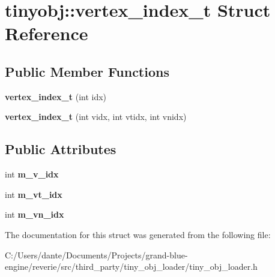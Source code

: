 \hypertarget{structtinyobj_1_1vertex__index__t}{}\section{tinyobj\+::vertex\+\_\+index\+\_\+t Struct Reference}
\label{structtinyobj_1_1vertex__index__t}
\subsection*{Public Member Functions}
\begin{DoxyCompactItemize}
\item 
\mbox{\label{structtinyobj_1_1vertex__index__t_a1319416ee790dddb034ddb6a7b4da78d}} 
{\bfseries vertex\+\_\+index\+\_\+t} (int idx)
\item 
\mbox{\label{structtinyobj_1_1vertex__index__t_a4bc62ff5633deb3d0f6d66c8c9e29bcd}} 
{\bfseries vertex\+\_\+index\+\_\+t} (int vidx, int vtidx, int vnidx)
\end{DoxyCompactItemize}
\subsection*{Public Attributes}
\begin{DoxyCompactItemize}
\item 
\mbox{\label{structtinyobj_1_1vertex__index__t_ab4575992fd4e7e101402e077ef033f90}} 
int {\bfseries m\+\_\+v\+\_\+idx}
\item 
\mbox{\label{structtinyobj_1_1vertex__index__t_a1a4121d11b9762f26da7a6e7c302425a}} 
int {\bfseries m\+\_\+vt\+\_\+idx}
\item 
\mbox{\label{structtinyobj_1_1vertex__index__t_a8b0b6b512c468c426f6c57a52716c05a}} 
int {\bfseries m\+\_\+vn\+\_\+idx}
\end{DoxyCompactItemize}


The documentation for this struct was generated from the following file\+:\begin{DoxyCompactItemize}
\item 
C\+:/\+Users/dante/\+Documents/\+Projects/grand-\/blue-\/engine/reverie/src/third\+\_\+party/tiny\+\_\+obj\+\_\+loader/tiny\+\_\+obj\+\_\+loader.\+h\end{DoxyCompactItemize}
